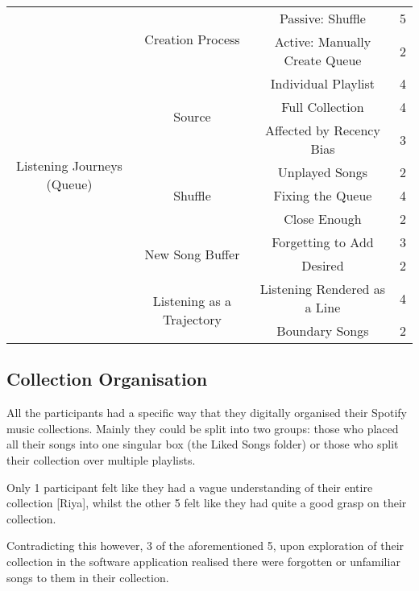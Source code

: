 \begin{longtable}[c]{| c | c | c | c|}
    \multirow{12}{6em}{Listening Journeys (Queue)} & \multirow{2}{*}{Creation Process} & Passive: Shuffle & 5\\*
    \cmidrule{3-4}
            & & Active: Manually Create Queue & 2\\*
        \cmidrule{2-4}
        & \multirow{3}{*}{Source} & Individual Playlist & 4\\*
        \cmidrule{3-4}
            & & Full Collection & 4\\*
            \cmidrule{3-4}
            & & Affected by Recency Bias & 3\\*
        \cmidrule{2-4}
        & \multirow{3}{*}{Shuffle} & Unplayed Songs & 2\\*
        \cmidrule{3-4}
            & & Fixing the Queue & 4\\*
            \cmidrule{3-4}
            & & Close Enough & 2\\*
        \cmidrule{2-4}
        & \multirow{2}{*}{New Song Buffer} & Forgetting to Add & 3\\*
        \cmidrule{3-4}
            & & Desired & 2\\*
        \cmidrule{2-4}
        & \multirow{2}{*}{Listening as a Trajectory} & Listening Rendered as a Line & 4\\*
        \cmidrule{3-4}
            & & Boundary Songs & 2\\*%
    \midrule
\end{longtable}

\subsection{Collection Organisation}%
All the participants had a specific way that they digitally organised their Spotify music collections. Mainly they could be split into two groups: those who placed all their songs into one singular box (the Liked Songs folder) or those who split their collection over multiple playlists.

Only 1 participant felt like they had a vague understanding of their entire collection [Riya], whilst the other 5 felt like they had quite a good grasp on their collection.

Contradicting this however, 3 of the aforementioned 5, upon exploration of their collection in the software application realised there were forgotten or unfamiliar songs to them in their collection.

